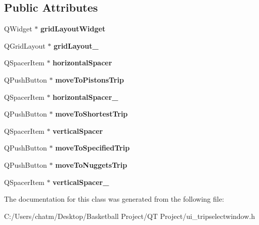 \subsection*{Public Attributes}
\begin{DoxyCompactItemize}
\item 
\mbox{\label{class_ui___trip_select_window_a9f27a22496099f5885ab90f62f691473}} 
Q\+Widget $\ast$ {\bfseries grid\+Layout\+Widget}
\item 
\mbox{\label{class_ui___trip_select_window_a9bfc51a76f995830505f00ed0ba82295}} 
Q\+Grid\+Layout $\ast$ {\bfseries grid\+Layout\+\_}
\item 
\mbox{\label{class_ui___trip_select_window_a5af82fcbaa42db1ed8890ecd5298776c}} 
Q\+Spacer\+Item $\ast$ {\bfseries horizontal\+Spacer}
\item 
\mbox{\label{class_ui___trip_select_window_ad2f3929d1d2ee37d70e8a390297894aa}} 
Q\+Push\+Button $\ast$ {\bfseries move\+To\+Pistons\+Trip}
\item 
\mbox{\label{class_ui___trip_select_window_a5341b6ec3726747d926ec38901f73cf4}} 
Q\+Spacer\+Item $\ast$ {\bfseries horizontal\+Spacer\+\_}
\item 
\mbox{\label{class_ui___trip_select_window_a2befca0115572e696ab5f002a3ea207a}} 
Q\+Push\+Button $\ast$ {\bfseries move\+To\+Shortest\+Trip}
\item 
\mbox{\label{class_ui___trip_select_window_a7b33a116cee86f190065468550928eee}} 
Q\+Spacer\+Item $\ast$ {\bfseries vertical\+Spacer}
\item 
\mbox{\label{class_ui___trip_select_window_af170a336046ac16daef9bfa153a366eb}} 
Q\+Push\+Button $\ast$ {\bfseries move\+To\+Specified\+Trip}
\item 
\mbox{\label{class_ui___trip_select_window_af040106b7e990c6887afd2ba275ca3b0}} 
Q\+Push\+Button $\ast$ {\bfseries move\+To\+Nuggets\+Trip}
\item 
\mbox{\label{class_ui___trip_select_window_acc0cd53f61b92a5c7f3c6a941dab67cb}} 
Q\+Spacer\+Item $\ast$ {\bfseries vertical\+Spacer\+\_}
\end{DoxyCompactItemize}


The documentation for this class was generated from the following file\+:\begin{DoxyCompactItemize}
\item 
C\+:/\+Users/chatm/\+Desktop/\+Basketball Project/\+Q\+T Project/ui\+\_\+tripselectwindow.\+h\end{DoxyCompactItemize}
